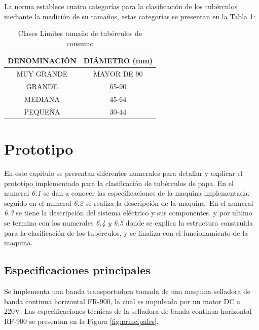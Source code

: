 		La norma establece cuatro categorías para la clasificación de los tubérculos mediante la medición de su tamaños, estas categorías se presentan en la Tabla \ref{table:limites}:
		
	\begin{table}[ht]
		\centering
		\begin{tabular}{|c|c|}
			\hline
			DENOMINACIÓN & DIÁMETRO (mm) \\
			\hline
			MUY GRANDE & MAYOR DE 90 \\
			\hline
			GRANDE & 65-90 \\
			\hline
			MEDIANA	& 45-64 \\
			\hline
			PEQUEÑA & 30-44 \\
			\hline
		\end{tabular}	
		\caption{Clases Limites tamaño de tubérculos de consumo}
		\label{table:limites}
	\end{table}	
	
\newpage
\chapter{Prototipo}
	En este capitulo se presentan diferentes numerales para detallar y explicar el prototipo implementado para la clasificación de tubérculos de papa. En el numeral \textit{6.1} se dan a conocer las especificaciones de la maquina implementada. seguido en el numeral \textit{6.2} se realiza la descripción de la maquina. En el numeral \textit{6.3} se tiene la descripción del sistema eléctrico y sus componentes, y por ultimo se termina con los numerales \textit{6.4 y 6.5} donde se explica la estructura construida para la clasificación de los tubérculos, y se finaliza con el funcionamiento de la maquina.
	
	\section{Especificaciones principales}
		Se implementa una banda transportadora tomada de una maquina selladora de banda continua horizontal FR-900, la cual es impulsada por un motor DC a 220V.
		Las especificaciones técnicas de la selladora de banda continua horizontal RF-900 se presentan en la Figura \ref{fig:principales}.
		
